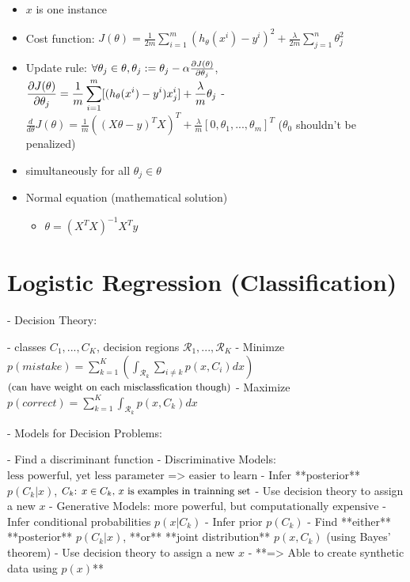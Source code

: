 \begin{itemize}
\begin{itemize}
	\item $x$ is one instance
	\item Cost function: $\displaystyle J(\theta)=\frac{1}{2m}\sum_{i=1}^m(h_\theta(x^i)-y^i)^2+\frac{\lambda}{2m}\sum^n_{j=1}\theta_j^2$ 
	\item Update rule: $\forall \theta_j \in \theta, \theta_j := \theta_j-\alpha\large\frac{\partial J(\theta)}{\partial\theta_j}$, $\displaystyle \small\frac{\partial J(\theta)}{\partial\theta_j}=\frac{1}{m}\sum^m_{i=1}[(h_\theta(x^i)-y^i)x_j^i] + \frac\lambda m\theta_j$ 
	- $\displaystyle \frac {d}{d\theta}J(\theta) = \frac 1m ((X\theta-y)^TX)^T + \frac \lambda m [0,\theta_1,...,\theta_m]^T$ ($\theta_0$ shouldn't be penalized)
	\item simultaneously for all $\theta_j \in \theta$ 
	\item Normal equation (mathematical solution)
		\begin{itemize}
		\item $\theta = (X^TX)^{-1}X^Ty$  
		\end{itemize}
	\end{itemize}
\end{itemize}

\section{Logistic Regression (Classification)}

- Decision Theory:

- classes $C_1,...,C_K$, decision regions $\mathcal {R}_1,...,\mathcal{R}_K$ 
- Minimze $\displaystyle p(mistake) = \sum_{k=1}^K (\int_{\mathcal {R}_k} \sum_{i \neq k} p(x,C_i)dx)$ $\small \text{(can have weight on each misclassfication though)}$  
- Maximize $\displaystyle p(correct) = \sum_{k=1}^K \int _{\mathcal {R}_k}p(x,C_k)dx$ 

- Models for Decision Problems:

- Find a discriminant function
- Discriminative Models: $\text{less powerful, yet less parameter => easier to learn}$ 
- Infer **posterior** $p(C_k|x)$, $\small \text{$C_k$: $x \in C_k$, $x$ is examples in trainning set}$ 
- Use decision theory to assign a new $x$ 
- Generative Models: $\text{more powerful, but computationally expensive}$ 
- Infer conditional probabilities $p(x|C_k)$ 
- Infer prior $p(C_k)$ 
- Find **either** **posterior** $p(C_k|x)$, **or** **joint distribution** $p(x, C_k)$ (using Bayes' theorem)
- Use decision theory to assign a new $x$ 
- **=> Able to create synthetic data using $p(x)$** 

